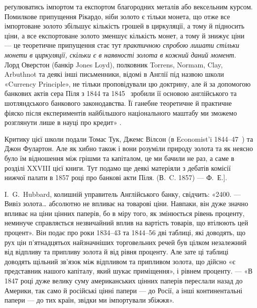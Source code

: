 \parcont{}  %
реґулюватись імпортом та експортом благородних металів або вексельним курсом.
Помилкове припущення Рікардо, ніби золото є тільки монета, що отже все імпортоване
золото збільшує кількість грошей в циркуляції, а тому й підносить ціни,
а все експортоване золото зменшує кількість монет, а тому й знижує ціни —
це теоретичне припущення стає тут \emph{практичною спробою лишати стільки
монети в циркуляції, скільки є в наявності золота в кожний даний
момент}. Лорд Оверстон (банкір Jones Loyd), полковник Torrens, Normam, Clay,
Arbuthnot та деякі інші письменники, відомі в Англії під назвою школи «Currency
Principle», не тільки проповідували цю доктрину, але й за допомогою банкових
актів сера Піля з 1844 та 1845~ зробили її основою англійського та шотляндського
банкового законодавства. Її ганебне теоретичне й практичне фіяско після
експериментів найбільшого національного маштабу ми зможемо розглянути лише
в науці про кредит» .

Критику цієї школи подали Томас Тук, Джемс Вілсон (в Economist’i 1844--47~)
та Джон Фулартон. Але як хибно також і вони розуміли природу золота
та як неясно було їм відношення між грішми та капіталом, це ми бачили не
раз, а саме в розділі XXVIII цієї книги. Тут подамо ще деякі матеріяли з дебатів
комісії нижчої палати в 1857 році про банкові акти Піля. (В.~C. 1857) — Ф.~Е.].

I.~G.~Hubbard, колишній управитель Англійського банку, свідчить: «2400. —
Вивіз золота\dots{} абсолютно не впливає на товарові ціни. Навпаки, він дуже
значно впливає на ціни цінних паперів, бо в міру того, як змінюється рівень
проценту, неминуче справляється незвичайний вплив на вартість товарів, що втілюють
цей процент». Він подає про роки 1834--43 та 1844--56 дві таблиці,
які доводять, що рух цін п’ятнадцятьох найзначніших торговельних речей був
цілком незалежний від відпливу та припливу золота й від рівня проценту. Але
зате ці таблиці доводять щільний зв’язок між відпливом та припливом золота,
що дійсно «є представник нашого капіталу, який шукає приміщення», і рівнем
проценту. — «В 1847 році дуже велику суму американських цінних паперів переслали
назад до Америки, так само й російські цінні папери — до Росії, а інші
континентальні папери — до тих країн, звідки ми імпортували збіжжя».

